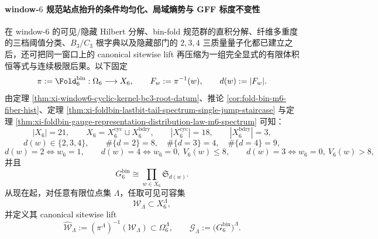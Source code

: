 \paragraph{window-\texorpdfstring{$6$}{6} 规范站点抬升的条件均匀化、局域熵势与 GFF 标度不变性}
在 window-\(6\) 的可见/隐藏 Hilbert 分解、bin-fold 规范群的直积分解、纤维多重度的三档阈值分类、\(B_3/C_3\) 根字典以及隐藏部门的 \(2,3,4\) 三质量量子化都已建立之后，还可把同一窗口上的 canonical sitewise lift 再压缩为一组完全显式的有限体积恒等式与连续极限后果。以下固定
\[
\pi:=\Fold_6^{\mathrm{bin}}:\Omega_6\longrightarrow X_6,
\qquad
F_w:=\pi^{-1}(w),
\qquad
d(w):=|F_w|.
\]
由定理 \ref{thm:xi-window6-cyclic-kernel-bc3-root-datum}、推论 \ref{cor:fold-bin-m6-fiber-hist}、定理 \ref{thm:xi-foldbin-lastbit-tail-spectrum-single-jump-staircase} 与定理 \ref{thm:xi-foldbin-gauge-representation-distribution-law-m6-spectrum} 可知：
\[
|X_6|=21,
\qquad
X_6=X_6^{\mathrm{cyc}}\sqcup X_6^{\mathrm{bdry}},
\qquad
|X_6^{\mathrm{cyc}}|=18,
\qquad
|X_6^{\mathrm{bdry}}|=3,
\]
\[
d(w)\in\{2,3,4\},
\qquad
\#\{d=2\}=8,\quad
\#\{d=3\}=4,\quad
\#\{d=4\}=9,
\]
\[
d(w)=2\iff w_6=1,
\qquad
d(w)=4\iff w_6=0,\ V_6(w)\le 8,
\qquad
d(w)=3\iff w_6=0,\ V_6(w)>8,
\]
并且
\[
G_6^{\mathrm{bin}}
\cong
\prod_{w\in X_6}\mathfrak S_{d(w)}.
\]
从现在起，对任意有限位点集 \(\Lambda\)，任取可见可容集
\[
\mathcal W_\Lambda\subset X_6^\Lambda,
\]
并定义其 canonical sitewise lift
\[
\widehat{\mathcal W}_\Lambda
:=
(\pi^\Lambda)^{-1}(\mathcal W_\Lambda)
\subset \Omega_6^\Lambda,
\qquad
\mathcal G_\Lambda:=
\bigl(G_6^{\mathrm{bin}}\bigr)^\Lambda.
\]


